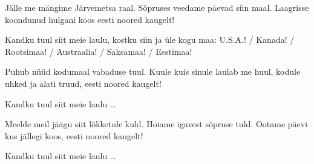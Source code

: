J\"alle me m\"angime J\"arvemetsa raal.
S\~opruses veedame p\"aevad siin maal.
Laagrisse koondunud hulgani koos
eesti noored kaugelt!

Kandku tuul siit meie laulu,
kostku siin ja \"ule kogu maa:
	U.S.A.! / Kanada! /	Rootsimaa! / Austraalia! / Saksamaa! / Eestimaa!

Puhub n\"u\"ud kodumaal vabaduse tuul.
Kuule kuis sinule laulab me huul,
kodule uhked ja alati truud,
eesti noored kaugelt!

Kandku tuul siit meie laulu \ldots

Meelde meil j\"a\"agu siit l\~okketule kuld.
Hoiame igavest s\~opruse tuld.
Ootame p\"aevi kus j\"allegi koos,
eesti noored kaugelt!

Kandku tuul siit meie laulu \ldots
